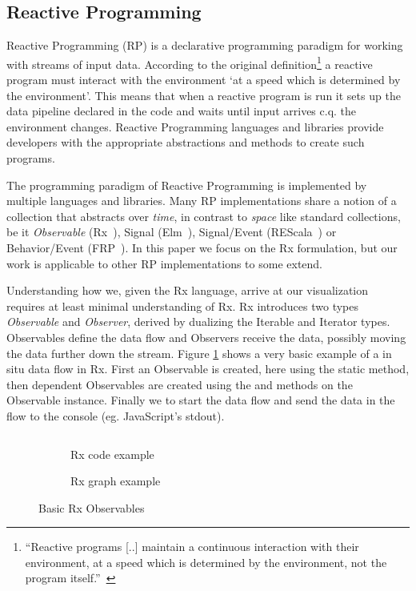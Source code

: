 \subsection{Reactive Programming}
\label{nutshell}
Reactive Programming (RP) is a declarative programming paradigm for working with streams of input data. 
According to the original definition\footnote{
``Reactive programs [..] maintain a continuous interaction with their environment, at a speed which is determined by the environment, not the program itself.''~\cite{berry1989real}
} a reactive program must interact with the environment `at a speed which is determined by the environment'.
This means that when a reactive program is run it sets up the data pipeline declared in the code and waits until input arrives c.q. the environment changes.
Reactive Programming languages and libraries provide developers with the appropriate abstractions and methods to create such programs.

The programming paradigm of Reactive Programming is implemented by multiple languages and libraries. Many RP implementations share a notion of a collection that abstracts over \textit{time}, in contrast to \textit{space} like standard collections, be it \textit{Observable} (Rx~\cite{meijer2010subject}), Signal (Elm~\cite{czaplicki2012elm}), Signal/Event (REScala~\cite{salvaneschi2014rescala}) or Behavior/Event (FRP~\cite{elliott1997functional}). In this paper we focus on the Rx formulation, but our work is applicable to other RP implementations to some extend. 

Understanding how we, given the Rx language, arrive at our visualization requires at least minimal understanding of Rx.
Rx introduces two types \textit{Observable} and \textit{Observer}, derived by dualizing the Iterable and Iterator types. Observables define the data flow and Observers receive the data, possibly moving the data further down the stream. Figure \ref{sample1} shows a very basic example of a in situ data flow in Rx. First an Observable is created, here using the static  method, then dependent Observables are created using the  and  methods on the Observable instance. Finally we  to start the data flow and send the data in the flow to the console (eg. JavaScript's stdout).

\begin{figure}

\begin{subfigure}[a]{\columnwidth}
\inputminted[tabsize=2]{javascript}{listings/sample1.js}	
\caption{Rx code example}
\label{sample1}
\end{subfigure}

\begin{subfigure}[b]{\columnwidth}
\centering

\caption{Rx graph example}
\label{chaincreate}
\end{subfigure}

\caption{Basic Rx  Observables}

\end{figure}

